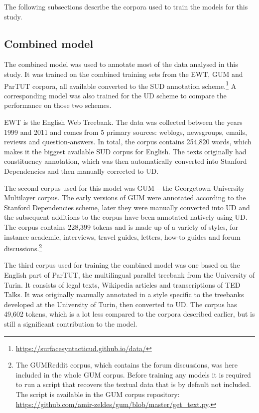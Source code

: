 The following subsections describe the corpora used to train the models for this study.

\subsection{Combined model}
The combined model was used to annotate most of the data analysed in this study. It was trained on the combined training sets from the EWT, GUM and ParTUT corpora, all available converted to the SUD annotation scheme.\footnote{\url{https://surfacesyntacticud.github.io/data/}} A corresponding model was also trained for the UD scheme to compare the performance on those two schemes.

EWT is the English Web Treebank. The data was collected between the years 1999 and 2011 and comes from 5 primary sources: weblogs, newsgroups, emails, reviews and question-answers. In total, the corpus contains 254,820 words, which makes it the biggest available SUD corpus for English. The texts originally had constituency annotation, which was then automatically converted into Stanford Dependencies and then manually corrected to UD. 

The second corpus used for this model was GUM -- the Georgetown University Multilayer corpus. The early versions of GUM were annotated according to the Stanford Dependencies scheme, later they were manually converted into UD and the subsequent additions to the corpus have been annotated natively using UD. The corpus contains 228,399 tokens and is made up of a variety of styles, for instance academic, interviews, travel guides, letters, how-to guides and forum discussions.\footnote{The GUMReddit corpus, which contains the forum discussions, was here included in the whole GUM corpus. Before training any models it is required to run a script that recovers the textual data that is by default not included. The script is available in the GUM corpus repository: \href{https://github.com/amir-zeldes/gum/blob/master/get_text.py}{https://github.com/amir-zeldes/gum/blob/master/get_text.py}.}

The third corpus used for training the combined model was one based on the English part of ParTUT, the multilingual parallel treebank from the University of Turin. It consists of legal texts, Wikipedia articles and transcriptions of TED Talks. It was originally manually annotated in a style specific to the treebanks developed at the University of Turin, then converted to UD. The corpus has 49,602 tokens, which is a lot less compared to the corpora described earlier, but is still a significant contribution to the model. 

